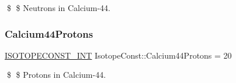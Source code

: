 \$ \$ Neutrons in Calcium-\/44. \mbox{\label{group___isotope_const-_calcium-_ca44_ga090721eca90d41ba986a97578cc3de55}} 
\subsubsection{\texorpdfstring{Calcium44\+Protons}{Calcium44Protons}}
{\footnotesize\ttfamily \mbox{\hyperlink{group___isotope_const-_macros_ga5f18360b3e99483a35c32d789e62621c}{I\+S\+O\+T\+O\+P\+E\+C\+O\+N\+S\+T\+\_\+\+I\+NT}} Isotope\+Const\+::\+Calcium44\+Protons = 20}

\$ \$ Protons in Calcium-\/44. 